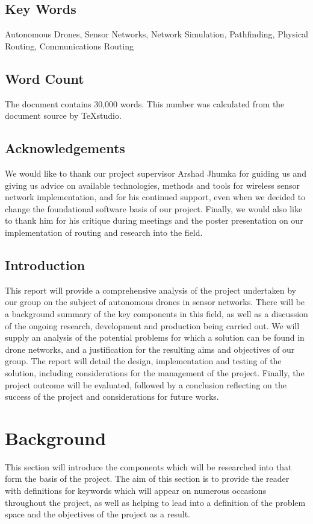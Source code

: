 \documentclass[12pt,a4paper,twoside]{report}
\begin{document}
	\section{Key Words}
	Autonomous Drones, Sensor Networks, Network Simulation, Pathfinding, Physical Routing, Communications Routing
	\section{Word Count}
	The document contains 30,000 words. This number was calculated from the document source by TeXstudio.
	\section{Acknowledgements}
	We would like to thank our project supervisor Arshad Jhumka for guiding us and giving us advice on available technologies, methods and tools for wireless sensor network implementation, and for his continued support, even when we decided to change the foundational software basis of our project. Finally, we would also like to thank him for his critique during meetings and the poster presentation on our implementation of routing and research into the field.
	\section{Introduction}
	This report will provide a comprehensive analysis of the project undertaken by our group on the subject of autonomous drones in sensor networks. There will be a background summary of the key components in this field, as well as a discussion of the ongoing research, development and production being carried out. We will supply an analysis of the potential problems for which a solution can be found in drone networks, and a justification for the resulting aims and objectives of our group. The report will detail the design, implementation and testing of the solution, including considerations for the management of the project. Finally, the project outcome will be evaluated, followed by a conclusion reflecting on the success of the project and considerations for future works.

\chapter{Background}
This section will introduce the components which will be researched into that form the basis of the project. The aim of this section is to provide the reader with definitions for keywords which will appear on numerous occasions throughout the project, as well as helping to lead into a definition of the problem space and the objectives of the project as a result. 
\end{document}

